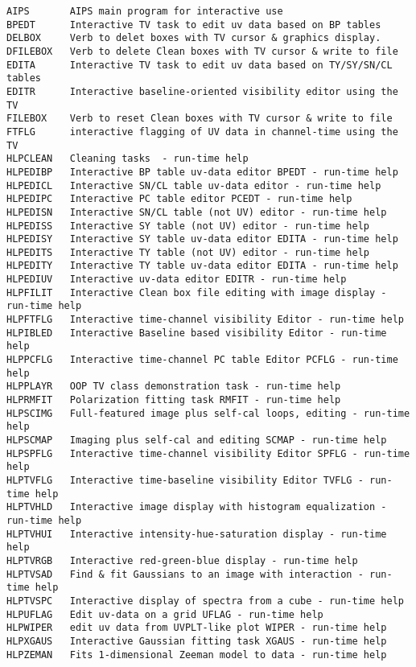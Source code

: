 \vskip 0.5pt
\bbve\begin{verbatim}
AIPS       AIPS main program for interactive use
BPEDT      Interactive TV task to edit uv data based on BP tables
DELBOX     Verb to delet boxes with TV cursor & graphics display.
DFILEBOX   Verb to delete Clean boxes with TV cursor & write to file
EDITA      Interactive TV task to edit uv data based on TY/SY/SN/CL tables
EDITR      Interactive baseline-oriented visibility editor using the TV
FILEBOX    Verb to reset Clean boxes with TV cursor & write to file
FTFLG      interactive flagging of UV data in channel-time using the TV
HLPCLEAN   Cleaning tasks  - run-time help
HLPEDIBP   Interactive BP table uv-data editor BPEDT - run-time help
HLPEDICL   Interactive SN/CL table uv-data editor - run-time help
HLPEDIPC   Interactive PC table editor PCEDT - run-time help
HLPEDISN   Interactive SN/CL table (not UV) editor - run-time help
HLPEDISS   Interactive SY table (not UV) editor - run-time help
HLPEDISY   Interactive SY table uv-data editor EDITA - run-time help
HLPEDITS   Interactive TY table (not UV) editor - run-time help
HLPEDITY   Interactive TY table uv-data editor EDITA - run-time help
HLPEDIUV   Interactive uv-data editor EDITR - run-time help
HLPFILIT   Interactive Clean box file editing with image display - run-time help
HLPFTFLG   Interactive time-channel visibility Editor - run-time help
HLPIBLED   Interactive Baseline based visibility Editor - run-time help
HLPPCFLG   Interactive time-channel PC table Editor PCFLG - run-time help
HLPPLAYR   OOP TV class demonstration task - run-time help
HLPRMFIT   Polarization fitting task RMFIT - run-time help
HLPSCIMG   Full-featured image plus self-cal loops, editing - run-time help
HLPSCMAP   Imaging plus self-cal and editing SCMAP - run-time help
HLPSPFLG   Interactive time-channel visibility Editor SPFLG - run-time help
HLPTVFLG   Interactive time-baseline visibility Editor TVFLG - run-time help
HLPTVHLD   Interactive image display with histogram equalization - run-time help
HLPTVHUI   Interactive intensity-hue-saturation display - run-time help
HLPTVRGB   Interactive red-green-blue display - run-time help
HLPTVSAD   Find & fit Gaussians to an image with interaction - run-time help
HLPTVSPC   Interactive display of spectra from a cube - run-time help
HLPUFLAG   Edit uv-data on a grid UFLAG - run-time help
HLPWIPER   edit uv data from UVPLT-like plot WIPER - run-time help
HLPXGAUS   Interactive Gaussian fitting task XGAUS - run-time help
HLPZEMAN   Fits 1-dimensional Zeeman model to data - run-time help

\end{verbatim}
